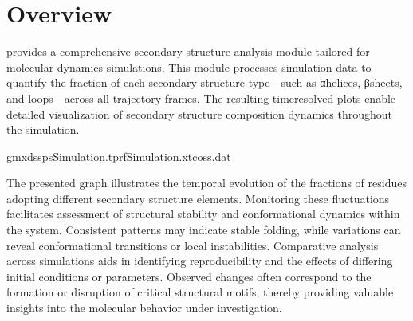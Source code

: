 \documentclass[a4paper,10pt,english]{sphinxmanual}
\begin{document}
\section{Overview}
\label{\detokenize{FractionSS:overview}}
\sphinxAtStartPar
{} provides a comprehensive secondary structure analysis module tailored for molecular dynamics simulations. This module processes simulation data to quantify the fraction of each secondary structure type—such as α\sphinxhyphen{}helices, β\sphinxhyphen{}sheets, and loops—across all trajectory frames. The resulting time\sphinxhyphen{}resolved plots enable detailed visualization of secondary structure composition dynamics throughout the simulation.

\sphinxAtStartPar
{}

\begin{sphinxVerbatim}[commandchars=\\\{\}]
gmxdssp\PYGZhy{}sSimulation.tpr\PYGZhy{}fSimulation.xtc\PYGZhy{}oss.dat
\end{sphinxVerbatim}

\begin{sphinxVerbatim}[commandchars=\\\{\}]
  
\end{sphinxVerbatim}

\noindent{}

\sphinxAtStartPar
{} The presented graph illustrates the temporal evolution of the fractions of residues adopting different secondary structure elements. Monitoring these fluctuations facilitates assessment of structural stability and conformational dynamics within the system. Consistent patterns may indicate stable folding, while variations can reveal conformational transitions or local instabilities. Comparative analysis across simulations aids in identifying reproducibility and the effects of differing initial conditions or parameters. Observed changes often correspond to the formation or disruption of critical structural motifs, thereby providing valuable insights into the molecular behavior under investigation.
\end{document}
